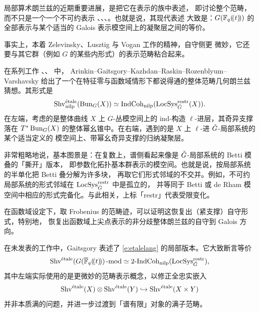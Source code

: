 	\ssszh[受限变化的局部几何朗兰兹] 局部算术朗兰兹的近期重要进展，是把它在表示的族中表述，
	即讨论整个范畴，而不只是一个一个不可约表示
	\cite{emertonhelm}、\cite{hellmann}、\cite{zhufamilies}、\cite{farguescholze}。也就是说，其现代表述
	大致是：$G(\mathbb{F}_q(\!(t)\!))$ 的全部表示与某个适当的 Galois 表示模空间上的凝聚层之间的等价。

	\begin{re} 事实上，本着 Zelevinsky、Lusztig 与 Vogan \cite{voganloclang} 工作的精神，自守侧更
	微妙，它还要与其它群（例如 $G$ 的某些内形式）的表示范畴粘合起来。
	\end{re}

    在系列工作 \cite{restrictedvar1}、\cite{restrictedvar2}、\cite{restrictedvar3} 中，
    Arinkin--Gaitsgory--Kazhdan--Raskin--Rozenblyum--Varshavsky
    给出了一个在特征零与函数域情形下都说得通的整体范畴几何朗兰兹猜想。其形式是
    \begin{equation} \label{e:etalelang}
           \operatorname{Shv}^{\text{étale}}_{\operatorname{nilp}}(\operatorname{Bun}_G(X)) \simeq
           \operatorname{IndCoh}_{\operatorname{nilp}}(\operatorname{LocSys}_{\check{G}}^{\operatorname{restr}}(X)).
    \end{equation}
%
	在左端，考虑的是整体曲线 $X$ 上 $G$-丛模空间上的 ind-构造 $\ell$-进层，其奇异支撑落在
	$T^* \operatorname{Bun}_G(X)$ 的整体幂幺锥中。在右端，遇到的是 $X$ 上 $\ell$-进 $\check{G}$-局部系统的某个适当定义的
	模空间上、带幂幺奇异支撑的归纳凝聚层。

	\begin{re}
	非常粗略地说，基本图景是：在复数上，谱侧看起来像是 $\check{G}$-局部系统的 Betti 模叠的「撕开」版本，
	即参数化拓扑基本群表示的模空间。也就是说，按局部系统的半单化把 Betti 叠分解为许多块，
	再取它们形式邻域的不交并。例如，不可约局部系统的形式邻域在 $\operatorname{LocSys}_{\check{G}}^{\operatorname{restr}}$ 中是孤立的，
	并等同于 Betti 或 de Rham 模空间中相应的形式完备化。与此相关，上标「restr」代表受限变化。
	\end{re}

	在函数域设定下，取 Frobenius 的范畴迹，可以证明这恢复出（紧支撑）自守形式，特别地，
	恢复出函数域上尖点表示的非分歧整体朗兰兹的自守到 Galois 方向。

	在未发表的工作中，Gaitsgory 表述了 \eqref{e:etalelang} 的局部版本。它大致断言等价
	\[
	     \operatorname{Shv}^{\text{étale}}(G(\overline{\mathbb{F}}_q(\!(t)\!))\operatorname{-mod} \simeq
	     \operatorname{2-IndCoh}_{\operatorname{nilp}}(\operatorname{LocSys}_{\check{G}}^{\operatorname{restr}}),
	\]
	其中左端实际使用的是更微妙的范畴表示概念，以修正全忠实嵌入
	\[
\operatorname{Shv}^{\text{étale}}(X) \otimes \operatorname{Shv}^{\text{étale}}(Y) \hookrightarrow \operatorname{Shv}^{\text{étale}}(X \times Y)
\]
	并非本质满的问题，并进一步过渡到「谱有限」对象的满子范畴。

